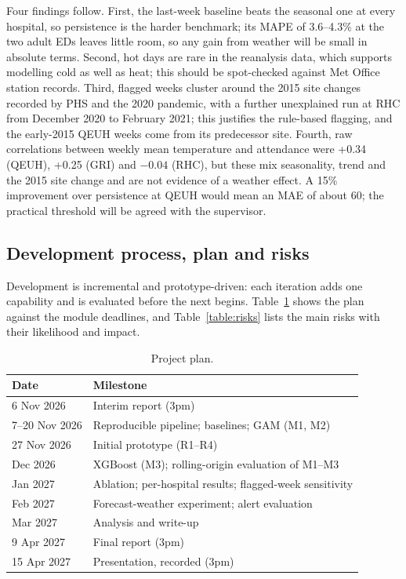 \documentclass[12pt]{article}
\begin{document}
Four findings follow. First, the last-week baseline beats the seasonal one at every hospital, so persistence is the harder benchmark; its MAPE of 3.6--4.3\% at the two adult EDs leaves little room, so any gain from weather will be small in absolute terms. Second, hot days are rare in the reanalysis data, which supports modelling cold as well as heat; this should be spot-checked against Met Office station records. Third, flagged weeks cluster around the 2015 site changes recorded by PHS \parencite{phs_ae_sites} and the 2020 pandemic, with a further unexplained run at RHC from December 2020 to February 2021; this justifies the rule-based flagging, and the early-2015 QEUH weeks come from its predecessor site. Fourth, raw correlations between weekly mean temperature and attendance were +0.34 (QEUH), +0.25 (GRI) and $-0.04$ (RHC), but these mix seasonality, trend and the 2015 site change and are not evidence of a weather effect. A 15\% improvement over persistence at QEUH would mean an MAE of about 60; the practical threshold will be agreed with the supervisor.

\subsection{Development process, plan and risks}
Development is incremental and prototype-driven: each iteration adds one capability and is evaluated before the next begins. Table~\ref{table:plan} shows the plan against the module deadlines, and Table~\ref{table:risks} lists the main risks with their likelihood and impact.

\begin{table}[h!]
\centering
\small
\begin{tabular}{|p{4.2cm}|p{9.6cm}|}
 \hline
 Date & Milestone \\
 \hline
 6 Nov 2026 & Interim report (3pm) \\
 7--20 Nov 2026 & Reproducible pipeline; baselines; GAM (M1, M2) \\
 27 Nov 2026 & Initial prototype (R1--R4) \\
 Dec 2026 & XGBoost (M3); rolling-origin evaluation of M1--M3 \\
 Jan 2027 & Ablation; per-hospital results; flagged-week sensitivity \\
 Feb 2027 & Forecast-weather experiment; alert evaluation \\
 Mar 2027 & Analysis and write-up \\
 9 Apr 2027 & Final report (3pm) \\
 15 Apr 2027 & Presentation, recorded (3pm) \\
 \hline
\end{tabular}
\caption{Project plan.}
\label{table:plan}
\end{table}
\end{document}
